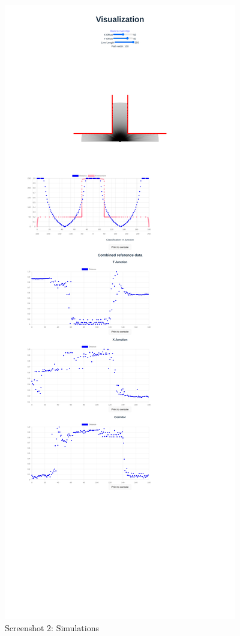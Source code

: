 \begin{figure}[H]
    \centering
    \includegraphics[width=0.8\linewidth]{figures/screenshot_2.png}
    \caption{Screenshot 2: Simulations}

    \label{fig:screenshot2}
\end{figure}
